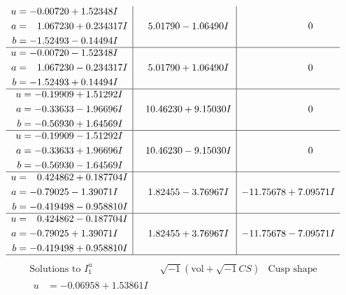 \documentclass[1p]{elsarticle_modified}
\theoremstyle{definition}
\newcommand{\I}{\sqrt{-1}}
\begin{document}
$$\begin{array}{c|c|c}
\begin{aligned}
u &= -0.00720 + 1.52348 I \\
a &= \phantom{-}1.067230 + 0.234317 I \\
b &= -1.52493 - 0.14494 I\end{aligned}
 & \phantom{-}5.01790 - 1.06490 I & \phantom{-0.000000 } 0 \\ \hline\begin{aligned}
u &= -0.00720 - 1.52348 I \\
a &= \phantom{-}1.067230 - 0.234317 I \\
b &= -1.52493 + 0.14494 I\end{aligned}
 & \phantom{-}5.01790 + 1.06490 I & \phantom{-0.000000 } 0 \\ \hline\begin{aligned}
u &= -0.19909 + 1.51292 I \\
a &= -0.33633 - 1.96696 I \\
b &= -0.56930 + 1.64569 I\end{aligned}
 & \phantom{-}10.46230 + 9.15030 I & \phantom{-0.000000 } 0 \\ \hline\begin{aligned}
u &= -0.19909 - 1.51292 I \\
a &= -0.33633 + 1.96696 I \\
b &= -0.56930 - 1.64569 I\end{aligned}
 & \phantom{-}10.46230 - 9.15030 I & \phantom{-0.000000 } 0 \\ \hline\begin{aligned}
u &= \phantom{-}0.424862 + 0.187704 I \\
a &= -0.79025 - 1.39071 I \\
b &= -0.419498 - 0.958810 I\end{aligned}
 & \phantom{-}1.82455 - 3.76967 I & -11.75678 + 7.09571 I \\ \hline\begin{aligned}
u &= \phantom{-}0.424862 - 0.187704 I \\
a &= -0.79025 + 1.39071 I \\
b &= -0.419498 + 0.958810 I\end{aligned}
 & \phantom{-}1.82455 + 3.76967 I & -11.75678 - 7.09571 I\\
 \hline 
 \end{array}$$\newpage$$\begin{array}{c|c|c}  
\text{Solutions to }I^u_{1}& \I (\text{vol} + \sqrt{-1}CS) & \text{Cusp shape}\\
 \hline 
\begin{aligned}
u &= -0.06958 + 1.53861 I \\

\end{aligned}
\end{array}$$
\end{document}
